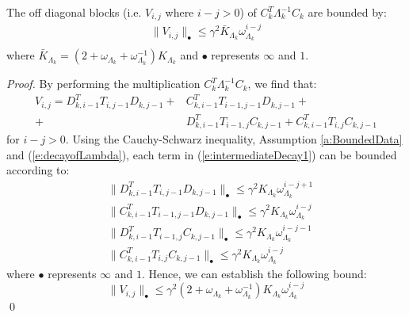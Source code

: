 \begin{proposition} \label{p:intermediateDecay}
The off diagonal blocks (i.e. $V_{i,j}$ where $i - j > 0$) of $C_k^T \Lambda_k^{-1} C_k$ are bounded by:
\begin{subequations}
\begin{align}
\| V_{i,j} \|_\bullet \leq \gamma^2 \bar{K}_{\Lambda_k} \omega_{\Lambda_k}^{i-j} \\
\end{align}
\end{subequations}
where $\bar{K}_{\Lambda_k} = (2 + \omega_{\Lambda_k} + \omega_{\Lambda_k}^{-1}) K_{\Lambda_k}$ and $\bullet$ represents $\infty$ and $1$.
\end{proposition}
\begin{proof}
By performing the multiplication $C_k^T \Lambda_k^{-1} C_k$, we find that:
\begin{equation} \label{e:intermediateDecay1}
\begin{aligned}
V_{i,j} = D_{k,i-1}^T T_{i,j-1} D_{k,j-1} + & C_{k,i-1}^T T_{i-1,j-1} D_{k,j-1} + \\ + & D_{k,i-1}^T T_{i-1,j} C_{k,j-1} + C_{k,i-1}^T T_{i,j} C_{k,j-1}
\end{aligned}
\end{equation}
for $i - j > 0$. Using the Cauchy-Schwarz inequality, Assumption \ref{a:BoundedData} and (\ref{e:decayofLambda}), each term in (\ref{e:intermediateDecay1}) can be bounded according to:
\begin{subequations}
\begin{align}
& \| D_{k,i-1}^T T_{i,j-1} D_{k,j-1} \|_\bullet \leq \gamma^2 K_{\Lambda_k} \omega_{\Lambda_k}^{i-j+1} \\
& \| C_{k,i-1}^T T_{i-1,j-1} D_{k,j-1} \|_\bullet \leq \gamma^2 K_{\Lambda_k} \omega_{\Lambda_k}^{i-j} \\
& \| D_{k,i-1}^T T_{i-1,j} C_{k,j-1} \|_\bullet \leq \gamma^2 K_{\Lambda_k} \omega_{\Lambda_k}^{i-j-1} \\
& \| C_{k,i-1}^T T_{i,j} C_{k,j-1} \|_\bullet \leq \gamma^2 K_{\Lambda_k} \omega_{\Lambda_k}^{i-j}
\end{align}
\end{subequations}
where $\bullet$ represents $\infty$ and $1$. Hence, we can establish the following bound:
\begin{equation}
\| V_{i,j} \|_{\bullet} \leq \gamma^2 (2 + \omega_{\Lambda_k} + \omega_{\Lambda_k}^{-1}) K_{\Lambda_k} \omega_{\Lambda_k}^{i-j}
\end{equation}
\qed
\end{proof}
